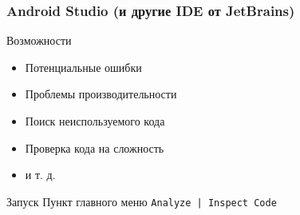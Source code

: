 \documentclass{beamer}
\begin{document}
\begin{frame}
    \frametitle{Android Studio (и другие IDE от JetBrains)}
    \begin{block}{Возможности}
        \begin{itemize}
            \item{Потенциальные ошибки}
            \item{Проблемы производительности}
            \item{Поиск неиспользуемого кода}
            \item{Проверка кода на сложность}
            \item{и т. д.}
        \end{itemize}
    \end{block}
    \begin{block}{Запуск}
        Пункт главного меню \texttt{Analyze | Inspect Code}
    \end{block}
\end{frame}
\end{document}
